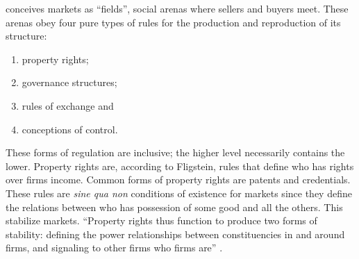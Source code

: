 \documentclass[a4paper, 12pt, openright, oneside, german, french, brazil, english, article]{abntex2}
\begin{document}
	
	
	 conceives markets as ``fields'', social arenas where sellers and buyers meet. These arenas obey four pure types of rules for the production and reproduction of its structure:
	
	\begin{enumerate}
		\item property rights;
		\item governance structures;
		\item rules of exchange and
		\item conceptions of control.
	\end{enumerate}
	
	
		
	
	These forms of regulation are inclusive; the higher level necessarily contains the lower. Property rights are, according to Fligstein, rules that define who has rights over firms income. Common forms of property rights are patents and credentials. These rules are \textit{sine qua non} conditions of existence for markets since they define the relations between who has possession of some good and all the others. This stabilize markets. ``Property rights thus function to produce two forms of stability: defining the power relationships between constituencies in and around firms, and signaling to other firms who firms are'' \cite[p. 34]{fligstein2002architecture}.
	
	
\end{document}
